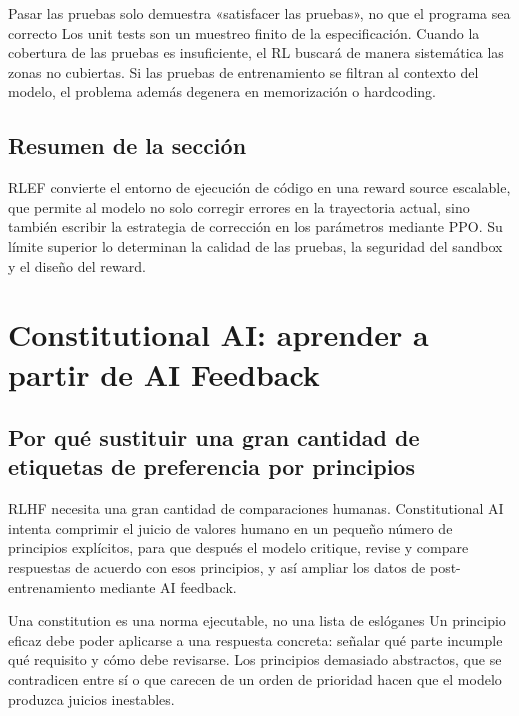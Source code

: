 \documentclass[a4paper]{article}
\begin{document}
\begin{warningbox}{Pasar las pruebas solo demuestra «satisfacer las pruebas», no que el programa sea correcto}
Los unit tests son un muestreo finito de la especificación. Cuando la cobertura de las pruebas es insuficiente, el RL buscará de manera sistemática las zonas no cubiertas. Si las pruebas de entrenamiento se filtran al contexto del modelo, el problema además degenera en memorización o hardcoding.
\end{warningbox}

\subsection{Resumen de la sección}

RLEF convierte el entorno de ejecución de código en una reward source escalable, que permite al modelo no solo corregir errores en la trayectoria actual, sino también escribir la estrategia de corrección en los parámetros mediante PPO. Su límite superior lo determinan la calidad de las pruebas, la seguridad del sandbox y el diseño del reward.
\section{Constitutional AI: aprender a partir de AI Feedback}

\subsection{Por qué sustituir una gran cantidad de etiquetas de preferencia por principios}

RLHF necesita una gran cantidad de comparaciones humanas. Constitutional AI intenta comprimir el juicio de valores humano en un pequeño número de principios explícitos, para que después el modelo critique, revise y compare respuestas de acuerdo con esos principios, y así ampliar los datos de post-entrenamiento mediante AI feedback.


\begin{knowledgebox}{Una constitution es una norma ejecutable, no una lista de eslóganes}
Un principio eficaz debe poder aplicarse a una respuesta concreta: señalar qué parte incumple qué requisito y cómo debe revisarse. Los principios demasiado abstractos, que se contradicen entre sí o que carecen de un orden de prioridad hacen que el modelo produzca juicios inestables.
\end{knowledgebox}
\end{document}
